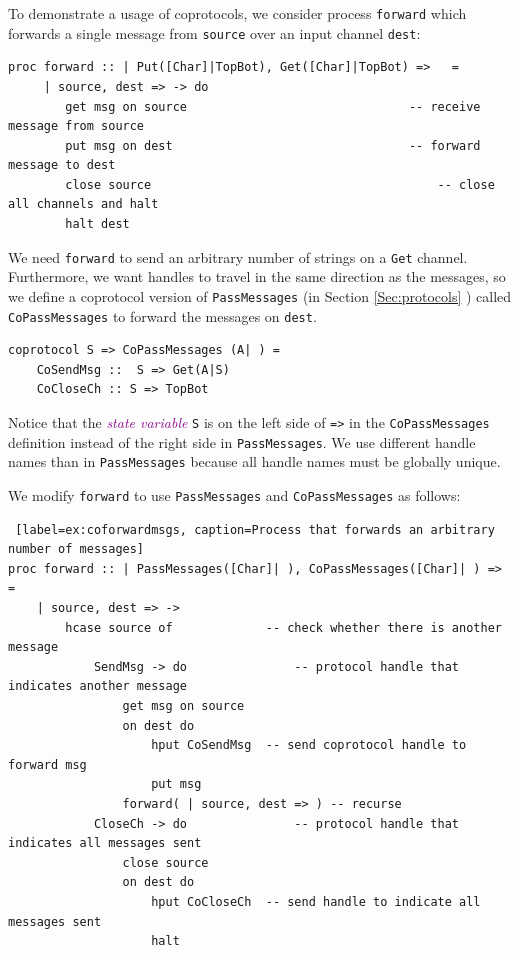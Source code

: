 \documentclass[11pt]{article}
\newcommand{\tc}[1]{\textcolor{darkMagenta}{\textit{#1}}}
\begin{document}
To demonstrate a usage of coprotocols, we consider  process \lstinline$forward$ which forwards a single message from \lstinline$source$ over an input channel \lstinline$dest$:
\begin{lstlisting}[label=ex:coforward, caption=Process that forwards a message]
proc forward :: | Put([Char]|TopBot), Get([Char]|TopBot) =>   =
	 | source, dest => -> do
		get msg on source								-- receive message from source
		put msg on dest									-- forward message to dest
		close source										-- close all channels and halt
		halt dest
\end{lstlisting}

We need \lstinline$forward$ to send an arbitrary number of strings on a \lstinline$Get$ channel. Furthermore, we want handles to travel in the same direction as the messages, so we define a coprotocol version of \lstinline$PassMessages$ (in Section \ref{Sec:protocols} 
) called \lstinline$CoPassMessages$ to forward the messages on \lstinline$dest$.

\begin{lstlisting}
coprotocol S => CoPassMessages (A| ) =
    CoSendMsg ::  S => Get(A|S)
    CoCloseCh :: S => TopBot
\end{lstlisting}
Notice that the \tc{state variable} \lstinline$S$ is on the left side of \lstinline$=>$ in the \lstinline$CoPassMessages$ definition instead of the right side in \lstinline$PassMessages$.
We use different handle names than in \lstinline$PassMessages$ because all handle names must be globally unique.

We modify \lstinline$forward$ to use \lstinline$PassMessages$ and \lstinline$CoPassMessages$ as follows:
\begin{lstlisting} [label=ex:coforwardmsgs, caption=Process that forwards an arbitrary number of messages]
proc forward :: | PassMessages([Char]| ), CoPassMessages([Char]| ) => =
	| source, dest => ->
		hcase source of				-- check whether there is another message
			SendMsg -> do				-- protocol handle that indicates another message
				get msg on source
				on dest do
					hput CoSendMsg	-- send coprotocol handle to forward msg
					put msg
				forward( | source, dest => ) -- recurse
			CloseCh -> do				-- protocol handle that indicates all messages sent
				close source
				on dest do
					hput CoCloseCh	-- send handle to indicate all messages sent
					halt
 \end{lstlisting}
\end{document}
